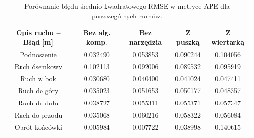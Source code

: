 {\small
\begin{table}[H]

	\begin{tabular}{||c | c c c c ||}

		\hline

		Opis ruchu --  Błąd [m]  &  Bez alg. komp. & Bez narzędzia & Z puszką  & Z wiertarką  \\ [0.5ex]

		\hline\hline

		Podnoszenie & 0.032490 & 0.053853 & 0.090244 & 0.104056 \\
		Ruch ósemkowy &0.102113  & 0.092006 & 0.089532 & 0.095919 \\
		Ruch w bok & 0.030680 & 0.040400 & 0.041024 &  0.047411\\
		Ruch do góry & 0.035023 & 0.051653 & 0.050177& 0.048357 \\
		Ruch do dołu & 0.038727 & 0.055311 & 0.055371 & 0.057347 \\
		Ruch do przodu & 0.035068 & 0.060216 & 0.058322 & 0.056084 \\
		Obrót końcówki & 0.005984 & 0.007722 & 0.038998 & 0.140615\\
		\hline

	\end{tabular}

	\caption{Porównanie błędu średnio-kwadratowego RMSE w metryce APE dla poszczególnych ruchów.}

	\label{tab:}

\end{table}
}